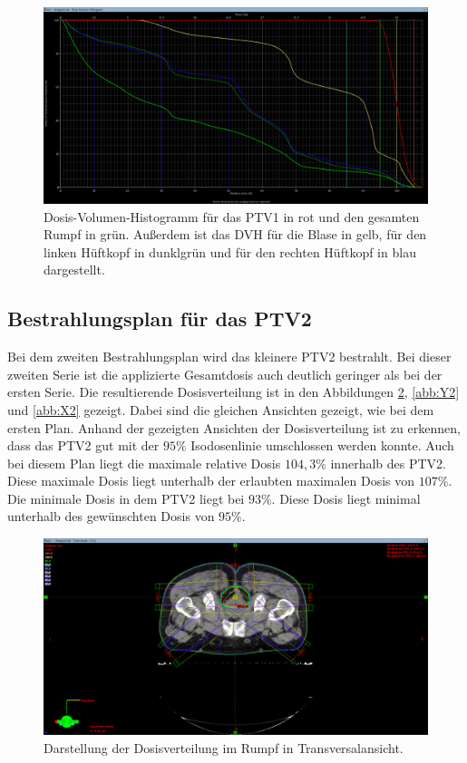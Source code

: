 \begin{figure}[H]
  \centering
  \includegraphics[width=\textwidth]{Bilder/Rektum1_DVH.png}
  \caption{Dosis-Volumen-Histogramm für das PTV1 in rot und den gesamten Rumpf in grün. Außerdem ist das DVH für die Blase in gelb, für den linken Hüftkopf in dunklgrün und für den rechten Hüftkopf in blau dargestellt.}
  \label{abb:DVH1}
\end{figure}

\subsection*{Bestrahlungsplan für das PTV2}

Bei dem zweiten Bestrahlungsplan wird das kleinere PTV2 bestrahlt. Bei dieser zweiten Serie ist die
applizierte Gesamtdosis auch deutlich geringer als bei der ersten Serie.
Die resultierende Dosisverteilung ist in den Abbildungen \ref{abb:Z2}, \ref{abb:Y2} und \ref{abb:X2} gezeigt.
Dabei sind die gleichen Ansichten gezeigt, wie bei dem ersten Plan. Anhand der gezeigten Ansichten der
Dosisverteilung ist zu erkennen, dass das PTV2 gut mit der $95\%$ Isodosenlinie umschlossen werden konnte.
Auch bei diesem Plan liegt die maximale relative Dosis $104,3\%$ innerhalb des PTV2. Diese maximale Dosis liegt unterhalb
der erlaubten maximalen Dosis von $107\%$. Die minimale Dosis in dem PTV2 liegt bei $93\%$. Diese Dosis liegt minimal unterhalb des gewünschten
Dosis von $95\%$.

\begin{figure}[H]
  \centering
  \includegraphics[width=\textwidth]{Bilder/Rektum2_Z.png}
  \caption{Darstellung der Dosisverteilung im Rumpf in Transversalansicht.}
  \label{abb:Z2}
\end{figure}


